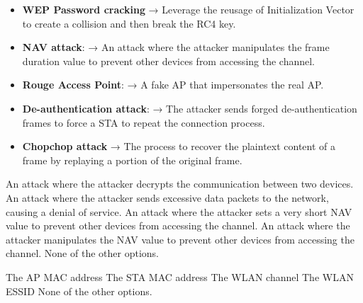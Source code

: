 \begin{solution}
    \begin{itemize}
        \item \textbf{WEP Password cracking} → Leverage the reusage of Initialization Vector to create a collision and then break the RC4 key.

        \item \textbf{NAV attack}: → An attack where the attacker manipulates the frame duration value to prevent other devices from accessing the channel.

        \item \textbf{Rouge Access Point}: → A fake AP that impersonates the real AP.

        \item \textbf{De-authentication attack}: → The attacker sends forged de-authentication frames to force a STA to repeat the connection process.

        \item \textbf{Chopchop attack} → The process to recover the plaintext content of a frame by replaying a portion of the original frame.
    \end{itemize}
\end{solution}

\begin{checkboxes}
    \choice An attack where the attacker decrypts the communication between two devices.
    \choice An attack where the attacker sends excessive data packets to the network, causing a denial of service.
    \choice An attack where the attacker sets a very short NAV value to prevent other devices from accessing the channel.
    \CorrectChoice An attack where the attacker manipulates the NAV value to prevent other devices from accessing the channel.
    \choice None of the other options.
\end{checkboxes}


\begin{checkboxes}
    \CorrectChoice The AP MAC address
    \CorrectChoice The STA MAC address
    \CorrectChoice The WLAN channel
    \choice The WLAN ESSID
    \choice None of the other options.
\end{checkboxes}


